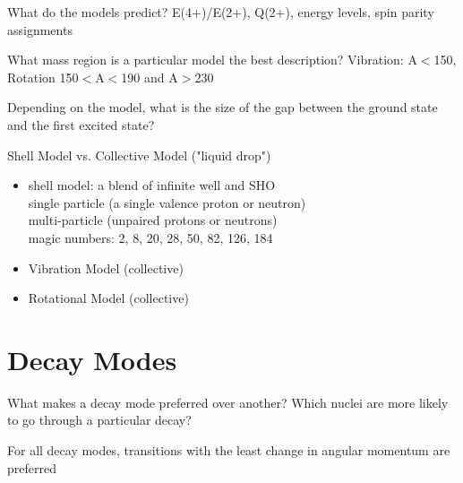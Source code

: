 \documentclass[letter]{article}
\begin{document}
What do the models predict? E(4+)/E(2+), Q(2+), energy levels, spin parity assignments

\vspace{10pt}

What mass region is a particular model the best description? Vibration: A$<$150, Rotation 150$<$A$<$190 and A$>$230 

Depending on the model, what is the size of the gap between the ground state and the first excited state? 

\vspace{10pt}

Shell Model vs. Collective Model ("liquid drop")

\begin{itemize}
\item shell model: a blend of infinite well and SHO\\ 
\hspace{10pt} single particle (a single valence proton or neutron) \\
\hspace{10pt} multi-particle (unpaired protons or neutrons)\\
\hspace{10pt} magic numbers: 2, 8, 20, 28, 50, 82, 126, 184
\vspace{10pt}
\item Vibration Model (collective)
\vspace{10pt}
\item Rotational Model (collective)
\end{itemize}

\section{Decay Modes}

What makes a decay mode preferred over another? Which nuclei are more likely to go through a particular decay?

\vspace{10pt}

For all decay modes, transitions with the least change in angular momentum are preferred
\end{document}
